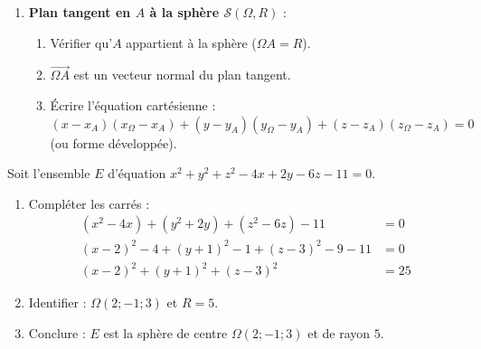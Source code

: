 \documentclass[11pt]{article}
\begin{document}
\begin{methode}
\begin{enumerate}
\begin{enumerate}
        \end{enumerate}
  \item \textbf{Plan tangent en $A$ à la sphère $\mathcal{S}(\Omega,R)$} :
        \begin{enumerate}
          \item Vérifier qu'$A$ appartient à la sphère ($\Omega A = R$).
          \item $\overrightarrow{\Omega A}$ est un vecteur normal du plan tangent.
          \item Écrire l'équation cartésienne : $(x-x_A)(x_\Omega-x_A) + (y-y_A)(y_\Omega-y_A) + (z-z_A)(z_\Omega-z_A) = 0$ (ou forme développée).
        \end{enumerate}
\end{enumerate}
\end{methode}

\begin{exemplebox}
Soit l'ensemble $E$ d'équation $x^2+y^2+z^2-4x+2y-6z-11=0$.
\begin{enumerate}
  \item Compléter les carrés :
  \[
  \begin{aligned}
  (x^2-4x) + (y^2+2y) + (z^2-6z) - 11 &= 0 \\
  (x-2)^2 - 4 + (y+1)^2 - 1 + (z-3)^2 - 9 - 11 &= 0 \\
  (x-2)^2 + (y+1)^2 + (z-3)^2 &= 25
  \end{aligned}
  \]
  \item Identifier : $\Omega(2;-1;3)$ et $R = 5$.
  \item Conclure : $E$ est la sphère de centre $\Omega(2;-1;3)$ et de rayon $5$.
\end{enumerate}
\end{exemplebox}
\end{document}
